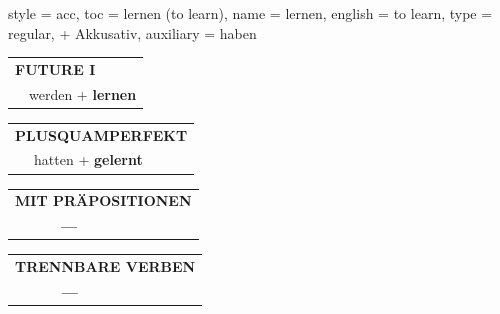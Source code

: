 \begin{verbentry}{
  style = {acc},
  toc = {lernen (to learn)},
  name = {lernen},
  english = {to learn},
  type = {regular, + Akkusativ},
  auxiliary = {haben}
}
\begin{tabular}{rl}
    \multicolumn{2}{l}{\textbf{FUTURE I} }\\
  &  werden + \textbf{lernen}\\
 
  \end{tabular}
\hfill
   \begin{tabular}{rl}
      \multicolumn{2}{l}{\textbf{PLUSQUAMPERFEKT}}\\
   & hatten + \textbf{gelernt}\\
  \end{tabular}
  
  
\vspace{10pt}

\begin{tabular}{lll}
\multicolumn{3}{l}{\textbf{MIT PRÄPOSITIONEN}}\\
& \textbf{---} & \\
\end{tabular}
\hfill
\begin{tabular}{lll}
\multicolumn{3}{l}{\textbf{TRENNBARE VERBEN}}\\
& \textbf{---} & \\
\end{tabular}
\vspace{-5pt}
\end{verbentry}

